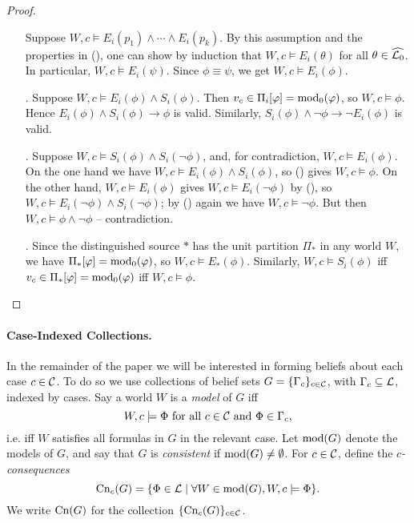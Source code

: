 \begin{proof}
\begin{itemize}
        Suppose $W, c \models E_i(p_1) \land \cdots \land E_i(p_k)$. By this
        assumption and the properties in (),
        one can show by induction that $W, c \models E_i(\theta)$ for all
        $\theta \in \widehat{\mathcal{L}{}_0}$. In particular, $W, c \models E_i(\psi)$.
        Since $\phi \equiv \psi$, we get $W, c \models E_i(\phi)$.

    \item[\labelcref{item:e_and_s_implies_phi}.]
        Suppose $W, c \models E_i(\phi) \land S_i(\phi)$. Then $v_c \in
        \Pi_i[\varphi] = \operatorname{mod}_0(\varphi)$, so $W, c \models \phi$. Hence
        $E_i(\phi) \land S_i(\phi) \rightarrow \phi$ is valid. Similarly,
        $S_i(\phi) \land \neg\phi \rightarrow \neg E_i(\phi)$ is valid.

    \item[\labelcref{item:sound_neg_pair}.]
        Suppose $W, c \models S_i(\phi) \land S_i(\neg\phi)$, and, for
        contradiction, $W, c \models E_i(\phi)$. On the one hand we have $W, c
        \models E_i(\phi) \land S_i(\phi)$, so
        () gives $W, c \models \phi$. On
        the other hand, $W, c \models E_i(\phi)$ gives $W, c \models
        E_i(\neg\phi)$ by (), so $W, c \models
        E_i(\neg\phi) \land S_i(\neg\phi)$; by
        () again we have $W, c \models
        \neg\phi$. But then $W, c \models \phi \land \neg\phi$ --
        contradiction.

    \item[\labelcref{item:star_exp}.]
        Since the distinguished source $\ast$ has the unit partition $\Pi_\ast$
        in any world $W$, we have $\Pi_\ast[\varphi] = \operatorname{mod}_0(\varphi)$, so $W, c
        \models E_\ast(\phi)$. Similarly, $W, c \models S_i(\phi)$ iff $v_c \in
        \Pi_\ast[\varphi] = \operatorname{mod}_0(\varphi)$ iff $W, c \models \phi$.

\end{itemize}
\end{proof}

\paragraph{Case-Indexed Collections.}

In the remainder of the paper we will be interested in forming beliefs about
each case $c \in \mathcal{C}$. To do so we use collections of belief
sets $G = \{\Gamma_c\}_{c \in \mathcal{C}}$, with $\Gamma_c \subseteq \mathcal{L}{}$, indexed by
cases.
%
Say a world $W$ is a \emph{model} of $G$ iff
\[
    W, c \models \Phi \text{ for all } c \in \mathcal{C} \text{ and } \Phi \in \Gamma_c,
\]
i.e. iff $W$ satisfies all formulas in $G$ in the relevant case. Let
$\operatorname{mod}(G)$ denote the models of $G$, and say that $G$ is
\emph{consistent} if $\operatorname{mod}(G) \ne \emptyset$. For $c \in \mathcal{C}$, define the
\emph{$c$-consequences}
\[
    \operatorname{Cn}_c(G) = \{\Phi \in \mathcal{L}{} \mid \forall W \in \operatorname{mod}(G), W, c \models \Phi\}.
\]
We write $\operatorname{Cn}(G)$
for the collection $\{\operatorname{Cn}_c(G)\}_{c \in \mathcal{C}}$.

